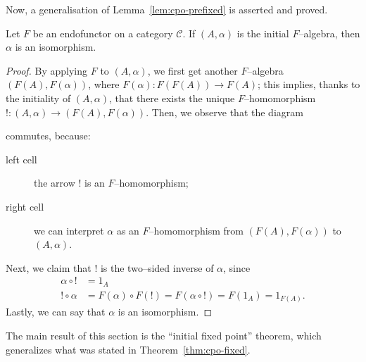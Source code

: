 Now, a generalisation of Lemma~\ref{lem:cpo-prefixed} is asserted and proved.
\begin{lem}
  Let \(F\) be an endofunctor on a category \(\mathcal{C}\).
  If \((A,\alpha)\) is the initial \(F\)--algebra, then \(\alpha{}\) is an isomorphism.
\end{lem}
\begin{proof}
  By applying \(F\) to \((A,\alpha)\), we first get another \(F\)--algebra \((F(A),F(\alpha))\), where \(F(\alpha) \colon F(F(A)) \to F(A)\); this implies, thanks to the initiality of \((A,\alpha)\), that there exists the unique \(F\)--homomorphism \(! \colon (A,\alpha) \to (F(A),F(\alpha))\).
  Then, we observe that the diagram
    \begin{center}
    \end{center}
 commutes, because:
  \begin{description}
    \item[left cell] the arrow \(!{}\) is an \(F\)--homomorphism;
    \item[right cell] we can interpret \(\alpha{}\) as an \(F\)--homomorphism from \((F(A),F(\alpha))\) to \((A,\alpha)\).
  \end{description}
  Next, we claim that \(!{}\) is the two--sided inverse of \(\alpha{}\), since %
  \begin{align*}
    \alpha \circ ! &= 1_A \\
    ! \circ \alpha &= F(\alpha) \circ F(!) = F (\alpha \circ !) = F(1_A) = 1_{F(A)}.
  \end{align*}
  Lastly, we can say that \(\alpha{}\) is an isomorphism.
\end{proof}

The main result of this section is the ``initial fixed point'' theorem, which generalizes what was stated in Theorem~\ref{thm:cpo-fixed}.

